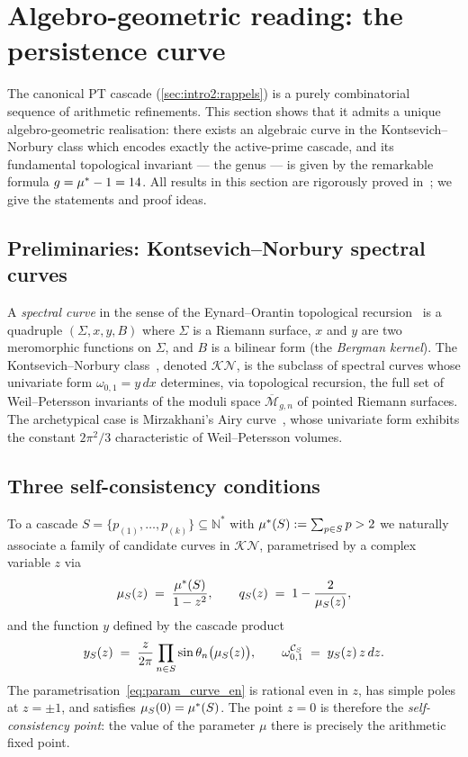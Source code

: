 \section{Algebro-geometric reading: the persistence curve}
\label{sec:courbe}

The canonical PT cascade (\ref{sec:intro2:rappels}) is a purely combinatorial sequence of arithmetic refinements. This section shows that it admits a unique algebro-geometric realisation: there exists an algebraic curve in the Kontsevich--Norbury class which encodes exactly the active-prime cascade, and its fundamental topological invariant --- the genus --- is given by the remarkable formula $g = \mu^{*} - 1 = 14$. All results in this section are rigorously proved in~\cite{PT_GeoFlow_PersistenceCurve}; we give the statements and proof ideas.

\subsection{Preliminaries: Kontsevich--Norbury spectral curves}
\label{sec:courbe:KN}

A \emph{spectral curve} in the sense of the Eynard--Orantin topological recursion~\cite{EynardOrantin2007} is a quadruple $(\Sigma, x, y, B)$ where $\Sigma$ is a Riemann surface, $x$ and $y$ are two meromorphic functions on $\Sigma$, and $B$ is a bilinear form (the \emph{Bergman kernel}). The Kontsevich--Norbury class~\cite{Kontsevich1992,Norbury2017}, denoted $\mathcal{KN}$, is the subclass of spectral curves whose univariate form $\omega_{0,1} = y\, dx$ determines, via topological recursion, the full set of Weil--Petersson invariants of the moduli space $\overline{\mathcal M}_{g,n}$ of pointed Riemann surfaces. The archetypical case is Mirzakhani's Airy curve~\cite{Mirzakhani2007}, whose univariate form exhibits the constant $2\pi^{2}/3$ characteristic of Weil--Petersson volumes.

\subsection{Three self-consistency conditions}
\label{sec:courbe:conditions}

To a cascade $S = \{p_{(1)}, \dots, p_{(k)}\} \subseteq \mathbb N^{*}$ with $\mu^{*}(S) := \sum_{p \in S} p > 2$ we naturally associate a family of candidate curves in $\mathcal{KN}$, parametrised by a complex variable $z$ via
\begin{equation}
\mu_S(z) \;=\; \dfrac{\mu^{*}(S)}{1 - z^{2}},
\qquad
q_S(z) \;=\; 1 - \dfrac{2}{\mu_S(z)},
\label{eq:param_curve_en}
\end{equation}
and the function $y$ defined by the cascade product
\begin{equation}
y_S(z) \;=\; \dfrac{z}{2\pi} \prod_{n \in S} \sin\theta_{n}\bigl(\mu_S(z)\bigr),
\qquad
\omega_{0,1}^{\mathcal C_S} \;=\; y_S(z)\,z\,dz.
\label{eq:y_S_en}
\end{equation}
The parametrisation~\eqref{eq:param_curve_en} is rational even in $z$, has simple poles at $z = \pm 1$, and satisfies $\mu_S(0) = \mu^{*}(S)$. The point $z = 0$ is therefore the \emph{self-consistency point}: the value of the parameter $\mu$ there is precisely the arithmetic fixed point.

